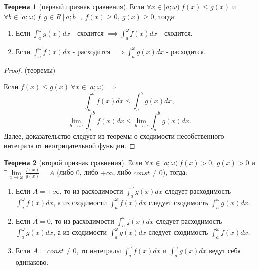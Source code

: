 \documentclass{report}
\theoremstyle{definition}
\newtheorem{theorem}{Теорема}[section]
\begin{document}
\begin{theorem}[первый признак сравнения]
  Если $\forall x \in [a;\omega) \ f(x) \leqslant g(x)$ и $\forall b \in [a;\omega) \ f,g \in R[a;b], \
    f(x) \geqslant 0, \ g(x) \geqslant 0$, тогда:
  \begin{enumerate}
    \item Если $\int_{a}^{\omega}g(x)dx$ - сходится $\implies \int_{a}^{\omega}f(x)dx$ - сходится.
    \item Если $\int_{a}^{\omega}f(x)dx$ - расходится $\implies \int_{a}^{\omega}g(x)dx$ - расходится.
  \end{enumerate}
\end{theorem}

\begin{proof}
  (теоремы)

  Если $f(x) \leqslant g(x) \ \forall x \in [a;\omega) \implies$
  \begin{equation*}
    \int_{a}^{b}f(x)dx \leqslant \int_{a}^{b}g(x)dx,
  \end{equation*}
  \begin{equation*}
    \underset{b\rightarrow \omega}{\lim}\int_{a}^{b}f(x)dx \leqslant \underset{b\rightarrow \omega}{\lim}
    \int_{a}^{b}g(x)dx.
  \end{equation*}
  Далее, доказательство следует из теоремы о сходимости несобственного интеграла от неотрицательной функции.
\end{proof}

\begin{theorem}[второй признак сравнения]
  Если $\forall x \in [a;\omega) \ f(x) > 0, \ g(x) > 0$ и $\exists \underset{x\rightarrow \omega}{\lim}
    \frac{f(x)}{g(x)} = A$ (либо $0$, либо $+\infty$, либо $const \ne 0$), тогда:
  \begin{enumerate}
    \item Если $A = +\infty$, то из расходимости $\int_{a}^{\omega}g(x)dx$ следует расходимость $\int_{a}^{\omega}
            f(x)dx$, а из сходимости $\int_{a}^{\omega}f(x)dx$ следует сходимость $\int_{a}^{\omega}g(x)dx$.
    \item Если $A = 0$, то из расходимости $\int_{a}^{\omega}f(x)dx$ следует расходимость $\int_{a}^{\omega}
            g(x)dx$, а из сходимости $\int_{a}^{\omega}g(x)dx$ следует сходимость $\int_{a}^{\omega}f(x)dx$.
    \item Если $A = const \ne 0$, то интегралы $\int_{a}^{\omega}f(x)dx$ и $\int_{a}^{\omega}g(x)dx$ ведут
          себя одинаково.
  \end{enumerate}
\end{theorem}
\end{document}
